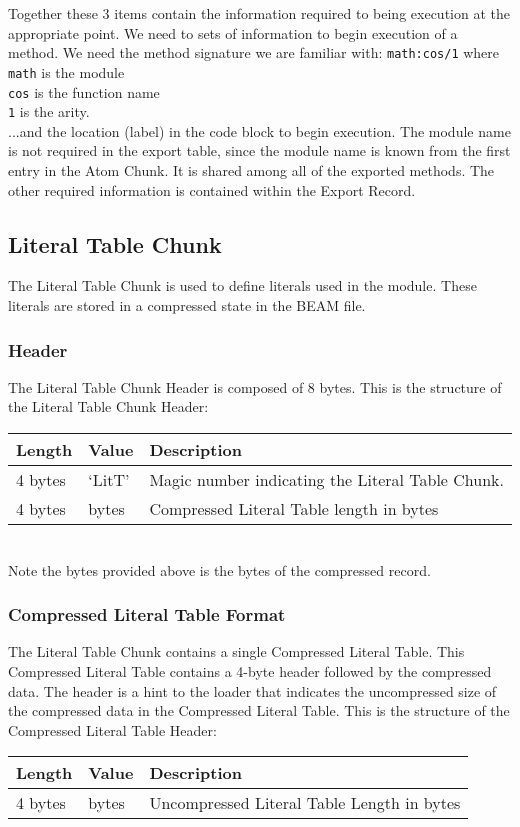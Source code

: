 \documentclass{article}
\begin{document}
Together these 3 items contain the information required to being execution at 
the appropriate point. We need to sets of information to begin execution of a 
method.  We need the method signature we are familiar with:
\texttt{math:cos/1} where\\
\texttt{math} is the module\\
\texttt{cos} is the function name\\
\texttt{1} is the arity.\\
...and the location (label) in the code block to begin execution. 
The module name is not required in the export table, since the module name
is known from the first entry in the Atom Chunk.  It is shared among all of 
the exported methods.  The other required information is contained within the 
Export Record.

\subsection{Literal Table Chunk}
The Literal Table Chunk is used to define literals used in the module.  
These literals are stored in a compressed state in the BEAM file.

\subsubsection{Header}
The Literal Table Chunk Header is composed of 8 bytes.
This is the structure of the Literal Table Chunk Header:\\
\begin{tabular}{ |l|l|p{3in}| } \hline
Length  & Value  & Description\\ \hline
4 bytes & `LitT' & Magic number indicating the Literal Table Chunk.\\ \hline
4 bytes & bytes & Compressed Literal Table length in bytes\\ \hline
\end{tabular}\\

Note the bytes provided above is the bytes of the compressed record.

\subsubsection{Compressed Literal Table Format}
The Literal Table Chunk contains a single Compressed Literal Table.  This 
Compressed Literal Table contains a 4-byte header followed by the compressed
data.  The header is a hint to the loader that indicates the uncompressed size of the 
compressed data in the Compressed Literal Table.
This is the structure of the Compressed Literal Table Header:\\
\begin{tabular}{ |l|l|p{3in}| } \hline
Length  & Value  & Description\\ \hline
4 bytes & bytes & Uncompressed Literal Table Length in bytes\\ \hline
\end{tabular}\\
\end{document}
